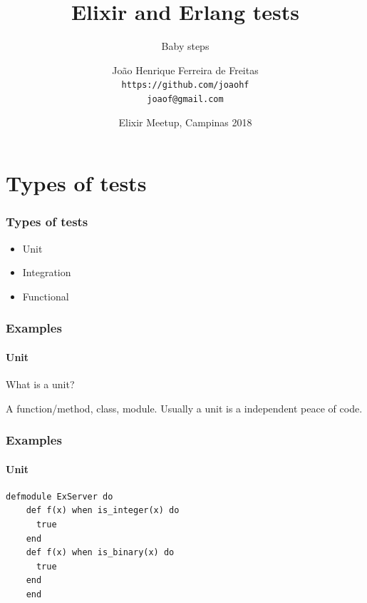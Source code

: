 \documentclass{beamer}
\title{Elixir and Erlang tests}
\subtitle{Baby steps}
\author[joaohf]{João Henrique Ferreira de Freitas \\ \texttt{https://github.com/joaohf} \\ \texttt{joaof@gmail.com}}
\date[EMC 2018]{Elixir Meetup, Campinas 2018}
\begin{document}
  \begin{frame}
    \titlepage
  \end{frame}

  \section[Section]{Types of tests}
  
  \begin{frame}
    \frametitle{Types of tests}   
    \begin{itemize}
      \item <1-> Unit
      \item <2-> Integration
      \item <3-> Functional    
    \end{itemize}
  \end{frame}
  
  \begin{frame}
    \frametitle{Examples}
    \framesubtitle{Unit}

    \begin{block}{}      
    What is a unit? \pause
    \end{block}
    
    \begin{alertblock}{}
    A function/method, class, module. Usually a unit is a independent peace of code.
    \end{alertblock}
    
  \end{frame}
  
  \begin{frame}[fragile]
    \frametitle{Examples}
    \framesubtitle{Unit}
    
    \begin{lstlisting}[]
    defmodule ExServer do
    def f(x) when is_integer(x) do  
      true
    end
    def f(x) when is_binary(x) do
      true
    end
    end
    \end{lstlisting}
  \end{frame}
  
\end{document}
